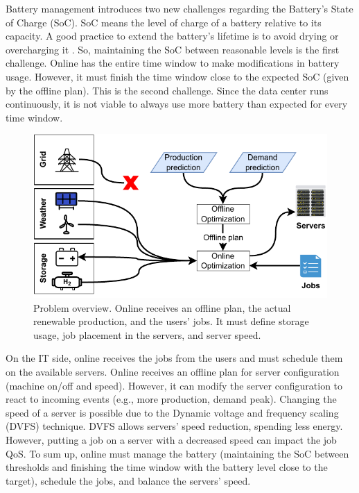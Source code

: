 Battery management introduces two new challenges regarding the Battery's State of Charge (SoC). SoC means the level of charge of a battery relative to its capacity. A good practice to extend the battery's lifetime is to avoid drying or overcharging it \cite{xu2016modeling}. So, maintaining the SoC between reasonable levels is the first challenge. Online has the entire time window to make modifications in battery usage. However, it must finish the time window close to the expected SoC (given by the offline plan). This is the second challenge. Since the data center runs continuously, it is not viable to always use more battery than expected for every time window. 

\begin{figure}[!htb]
    \centering
    \includegraphics[scale=1]{Images/Introduction/Problem_overview_thesis.pdf}
    \caption{Problem overview. Online receives an offline plan, the actual renewable production, and the users' jobs. It must define storage usage, job placement in the servers, and server speed.}
    \label{fig:introduction_problem}
\end{figure}

On the IT side, online receives the jobs from the users and must schedule them on the available servers. Online receives an offline plan for server configuration (machine on/off and speed). However, it can modify the server configuration to react to incoming events (e.g., more production, demand peak). Changing the speed of a server is possible due to the Dynamic voltage and frequency scaling (DVFS) technique. DVFS allows servers' speed reduction, spending less energy. However, putting a job on a server with a decreased speed can impact the job QoS. To sum up, online must manage the battery (maintaining the SoC between thresholds and finishing the time window with the battery level close to the target), schedule the jobs, and balance the servers' speed.

